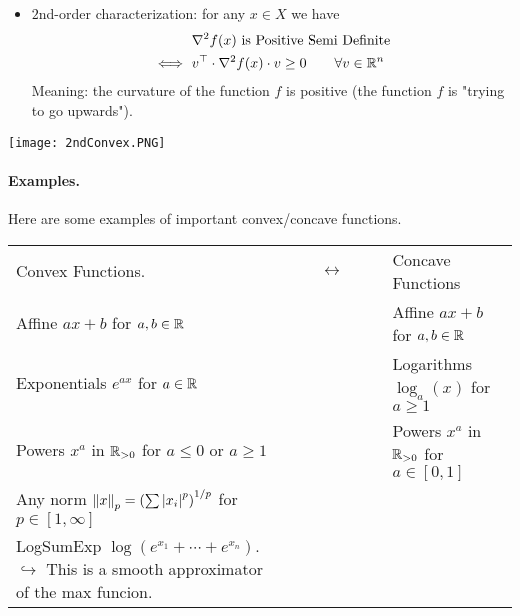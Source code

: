 \documentclass[answers]{exam}
\begin{document}
    \begin{minipage}{12cm}
        \begin{itemize}
            \item $2$nd-order characterization: for any $x\in X$ we have 
            \begin{align*}
                &\ \nabla^2 f(x)\text{ is Positive Semi Definite} \\ 
                \iff&\ v^\top\cdot  \nabla^2 f(x)\cdot v \geq 0 \quad\quad \forall v\in \mathbb{R}^n
            \end{align*}
            $$ $$
            Meaning: the curvature of the function $f$ is positive (the function $f$ is "trying to go upwards").
        \end{itemize} 
    \end{minipage}
    \hspace*{3mm}
    \begin{minipage}{6cm}    
        \texttt{[image: 2ndConvex.PNG]}
    \end{minipage} \clearpage
    \paragraph{Examples.} Here are some examples of important convex/concave functions. \vspace*{2mm}
    \begin{center}\renewcommand{\arraystretch}{1.7}
        \begin{tabular}{p{7cm}cp{7cm}}
            Convex Functions. & $\qquad\longleftrightarrow\qquad$ & Concave Functions\\ 
            \cmidrule{1-1}\cmidrule{3-3}
            Affine $ax+ b$ for $a,b\in \mathbb{R}$ &  & Affine $ax+ b$ for $a,b\in \mathbb{R}$ \\ 
            Exponentials $e^{ax}$ for $a\in \mathbb{R}$ & & Logarithms $\log_a(x)$ for $a \geq 1$ \\
            Powers $x^a$ in $\mathbb{R}_{>0}$ for $a\leq 0$ or $a\geq 1$ & & Powers $x^a$ in $\mathbb{R}_{>0}$ for $a\in [0,1]$ \\
            Any norm $\left\lVert x \right\rVert_p = \left(\sum \left| x_i \right|^p\right)^{1/p}$ for $p\in [1,\infty]$ & &  \\
            LogSumExp $\log\left(e^{x_1}+\cdots + e^{x_n}\right)$.\newline 
            $\hookrightarrow$ This is a smooth approximator of the max funcion. & &
        \end{tabular}
    \end{center}
\end{document}
